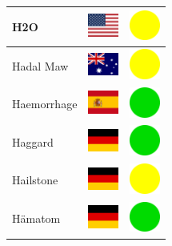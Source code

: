 \documentclass[12pt, a4paper, twoside]{report}
\begin{document}
\begin{center}
\begin{longtable}{|p{5cm}|p{2cm}|p{2cm}|}
 H2O                                                        & \includegraphics[width=1cm]{../4x3/us} &   \includegraphics[width=1cm]{../likes/m} \\ \hline
 Hadal Maw                                                  & \includegraphics[width=1cm]{../4x3/au} &   \includegraphics[width=1cm]{../likes/m} \\ \hline
 Haemorrhage                                                & \includegraphics[width=1cm]{../4x3/es} &   \includegraphics[width=1cm]{../likes/y} \\ \hline
 Haggard                                                    & \includegraphics[width=1cm]{../4x3/de} &   \includegraphics[width=1cm]{../likes/y} \\ \hline
 Hailstone                                                  & \includegraphics[width=1cm]{../4x3/de} &   \includegraphics[width=1cm]{../likes/m} \\ \hline
 Hämatom                                                    & \includegraphics[width=1cm]{../4x3/de} &   \includegraphics[width=1cm]{../likes/y} \\ \hline

\end{longtable}
\end{center}
\end{document}
